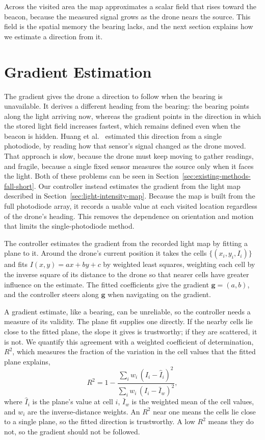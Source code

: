 Across the visited area the map approximates a scalar field that rises toward the beacon, because the measured signal grows as the drone nears the source. This field is the spatial memory the bearing lacks, and the next section explains how we estimate a direction from it.

\section{Gradient Estimation}
\label{sec:gradient-estimation}

The gradient gives the drone a direction to follow when the bearing is unavailable. It derives a different heading from the bearing: the bearing points along the light arriving now, whereas the gradient points in the direction in which the stored light field increases fastest, which remains defined even when the beacon is hidden. Huang et al.~\cite{huang2026lta} estimated this direction from a single photodiode, by reading how that sensor's signal changed as the drone moved. That approach is slow, because the drone must keep moving to gather readings, and fragile, because a single fixed sensor measures the source only when it faces the light. Both of these problems can be seen in Section~\ref{sec:existing-methods-fall-short}. Our controller instead estimates the gradient from the light map described in Section~\ref{sec:light-intensity-map}. Because the map is built from the full photodiode array, it records a usable value at each visited location regardless of the drone's heading. This removes the dependence on orientation and motion that limits the single-photodiode method.

The controller estimates the gradient from the recorded light map by fitting a plane to it. Around the drone's current position it takes the cells $\{(x_i, y_i, I_i)\}$ and fits $I(x,y) = a x + b y + c$ by weighted least squares, weighting each cell by the inverse square of its distance to the drone so that nearer cells have greater influence on the estimate. The fitted coefficients give the gradient $\mathbf{g} = (a, b)$, and the controller steers along $\mathbf{g}$ when navigating on the gradient.

A gradient estimate, like a bearing, can be unreliable, so the controller needs a measure of its validity. The plane fit supplies one directly. If the nearby cells lie close to the fitted plane, the slope it gives is trustworthy; if they are scattered, it is not. We quantify this agreement with a weighted coefficient of determination, $R^2$, which measures the fraction of the variation in the cell values that the fitted plane explains,
\begin{equation}
R^2 = 1 - \frac{\sum_i w_i\,(I_i - \hat{I}_i)^2}{\sum_i w_i\,(I_i - \bar{I}_w)^2},
\label{eq:gradient-r2}
\end{equation}
where $\hat{I}_i$ is the plane's value at cell $i$, $\bar{I}_w$ is the weighted mean of the cell values, and $w_i$ are the inverse-distance weights. An $R^2$ near one means the cells lie close to a single plane, so the fitted direction is trustworthy. A low $R^2$ means they do not, so the gradient should not be followed.

